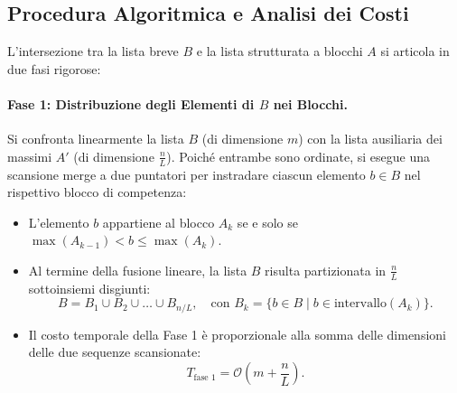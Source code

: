\FloatBarrier
\subsection{Procedura Algoritmica e Analisi dei Costi}
L'intersezione tra la lista breve $B$ e la lista strutturata a blocchi $A$ si articola in due fasi rigorose:

\paragraph{Fase 1: Distribuzione degli Elementi di $B$ nei Blocchi.}
Si confronta linearmente la lista $B$ (di dimensione $m$) con la lista ausiliaria dei massimi $A'$ (di dimensione $\frac{n}{L}$). Poiché entrambe sono ordinate, si esegue una scansione merge a due puntatori per instradare ciascun elemento $b \in B$ nel rispettivo blocco di competenza:
\begin{itemize}
  \item L'elemento $b$ appartiene al blocco $A_k$ se e solo se $\max(A_{k-1}) < b \le \max(A_k)$.
  \item Al termine della fusione lineare, la lista $B$ risulta partizionata in $\frac{n}{L}$ sottoinsiemi disgiunti:
  \begin{equation}
    B = B_1 \cup B_2 \cup \dots \cup B_{n/L}, \quad \text{con } B_k = \{b \in B \mid b \in \text{intervallo}(A_k)\}.
  \end{equation}
  \item Il costo temporale della Fase 1 è proporzionale alla somma delle dimensioni delle due sequenze scansionate:
  \begin{equation}
    T_{\text{fase 1}} = \mathcal{O}\left(m + \frac{n}{L}\right).
  \end{equation}
\end{itemize}

